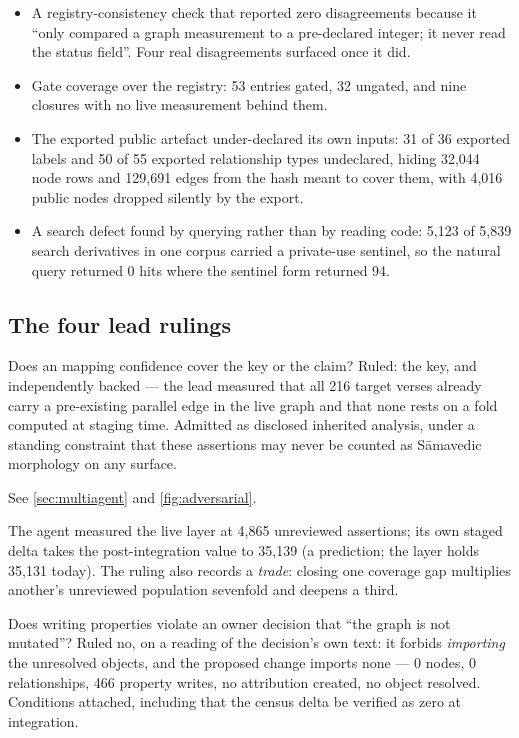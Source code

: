 \begin{itemize}[leftmargin=1.6em,itemsep=2pt,topsep=3pt]
\item A registry-consistency check that reported zero disagreements because it
``only compared a graph measurement to a pre-declared integer; it never read the
status field''. Four real disagreements surfaced once it did.
\item Gate coverage over the registry: 53 entries gated, 32 ungated, and nine
closures with no live measurement behind them.
\item The exported public artefact under-declared its own inputs: 31 of 36 exported
labels and 50 of 55 exported relationship types undeclared, hiding 32{,}044 node rows
and 129{,}691 edges from the hash meant to cover them, with 4{,}016 public nodes
dropped silently by the export.
\item A search defect found by querying rather than by reading code: 5{,}123 of
5{,}839 search derivatives in one corpus carried a private-use sentinel, so the
natural query returned 0 hits where the sentinel form returned 94.
\end{itemize}

\subsection{The four lead rulings}

\begin{description}[leftmargin=1.6em,itemsep=3pt,topsep=3pt,style=nextline]
\item[R1 --- cross-Veda text identity] Does an  mapping confidence cover
the key or the claim? Ruled: the key, and independently backed --- the lead measured
that all 216 target verses already carry a pre-existing parallel edge in the live
graph and that none rests on a fold computed at staging time. Admitted as disclosed
inherited analysis, under a standing constraint that these assertions may never be
counted as S\=amavedic morphology on any surface.
\item[R2 --- role re-anchoring] See \cref{sec:multiagent} and \cref{fig:adversarial}.
\item[R3 --- a corrected figure] The agent measured the live layer at 4{,}865
unreviewed assertions; its own staged delta takes the post-integration value to
35{,}139 (a prediction; the layer holds 35{,}131 today). The ruling also records a \emph{trade}: closing one coverage gap multiplies
another's unreviewed population sevenfold and deepens a third.
\item[R4 --- a property-only correction] Does writing properties violate an owner
decision that ``the graph is not mutated''? Ruled no, on a reading of the decision's
own text: it forbids \emph{importing} the unresolved objects, and the proposed change
imports none --- 0 nodes, 0 relationships, 466 property writes, no attribution
created, no object resolved. Conditions attached, including that the census delta be
verified as zero at integration.
\end{description}

